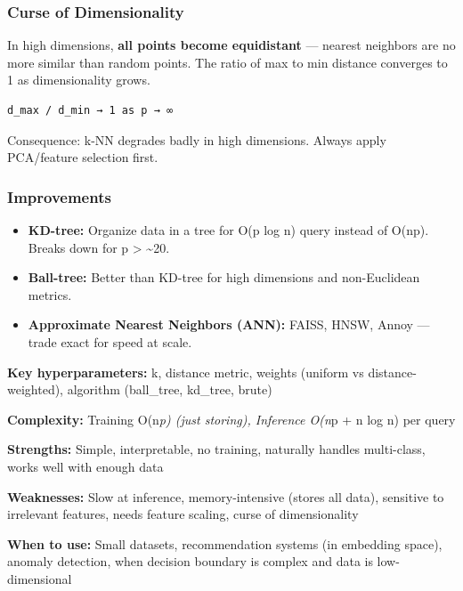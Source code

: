 \documentclass[11pt]{article}
\providecommand{\tightlist}{\setlength{\itemsep}{1pt}\setlength{\parskip}{0pt}}
\begin{document}
\subsubsection{Curse of Dimensionality}\label{curse-of-dimensionality}

In high dimensions, \textbf{all points become equidistant} --- nearest neighbors are no more similar than random points. The ratio of max to min distance converges to 1 as dimensionality grows.

\setcodelang{}

\begin{verbatim}
d_max / d_min → 1 as p → ∞
\end{verbatim}

Consequence: k-NN degrades badly in high dimensions. Always apply PCA/feature selection first.

\subsubsection{Improvements}\label{improvements}

\begin{itemize}
\tightlist
\item
  \textbf{KD-tree:} Organize data in a tree for O(p log n) query instead of O(np). Breaks down for p \textgreater{} \textasciitilde20.
\item
  \textbf{Ball-tree:} Better than KD-tree for high dimensions and non-Euclidean metrics.
\item
  \textbf{Approximate Nearest Neighbors (ANN):} FAISS, HNSW, Annoy --- trade exact for speed at scale.
\end{itemize}

\textbf{Key hyperparameters:} k, distance metric, weights (uniform vs distance-weighted), algorithm (ball\_tree, kd\_tree, brute)

\textbf{Complexity:} Training O(n\emph{p) (just storing), Inference O(n}p + n log n) per query

\textbf{Strengths:} Simple, interpretable, no training, naturally handles multi-class, works well with enough data

\textbf{Weaknesses:} Slow at inference, memory-intensive (stores all data), sensitive to irrelevant features, needs feature scaling, curse of dimensionality

\textbf{When to use:} Small datasets, recommendation systems (in embedding space), anomaly detection, when decision boundary is complex and data is low-dimensional
\end{document}
